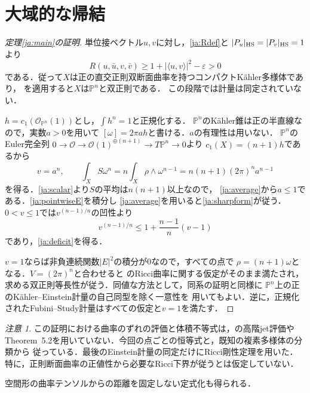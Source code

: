 \documentclass[12pt]{amsart}
\theoremstyle{definition}
\theoremstyle{remark}
\numberwithin{equation}{section}
\newcommand{\cO}{\mathcal{O}}
\theoremstyle{plain}
\theoremstyle{remark}
\newtheorem{jrem}[thm]{注意}
\theoremstyle{definition}
\begin{document}
\section{大域的な帰結}\label{ja:global}

\begin{proof}[定理\ref{ja:main}の証明]
単位接ベクトル$u,v$に対し，\eqref{ja:Rdef}と
$|P_u|_{\rm HS}=|P_v|_{\rm HS}=1$より
\[
 R(u,\bar u,v,\bar v)
 \geq1+|\langle u,v\rangle|^2-\varepsilon>0
\]
である．従って$X$は正の直交正則双断面曲率を持つコンパクトK\"ahler多様体であり，
\cite[Theorem 0.1]{ja:FLW}を適用すると$X$は$\mathbb P^n$と双正則である．
この段階では計量は同定されていない．

$h=c_1(\cO_{\mathbb P^n}(1))$とし，$\int h^n=1$と正規化する．
$\mathbb P^n$のK\"ahler錐は正の半直線なので，実数$a>0$を用いて
$[\omega]=2\pi a h$と書ける．$a$の有理性は用いない．
$\mathbb P^n$のEuler完全列
$0\to\cO\to\cO(1)^{\oplus(n+1)}\to T\mathbb P^n\to0$より
$c_1(X)=(n+1)h$であるから
\begin{equation}\label{ja:average}
 v=a^n,\qquad
 \int_X S\omega^n
 =n\int_X\rho\wedge\omega^{n-1}
 =n(n+1)(2\pi)^n a^{n-1}
\end{equation}
を得る．\eqref{ja:scalar}より$S$の平均は$n(n+1)$以上なので，
\eqref{ja:average}から$a\leq1$である．\eqref{ja:pointwiseE}を積分し
\eqref{ja:average}を用いると\eqref{ja:sharpform}が従う．
$0<v\leq1$では$v^{(n-1)/n}$の凹性より
\[
 v^{(n-1)/n}\leq1+\frac{n-1}{n}(v-1)
\]
であり，\eqref{ja:deficit}を得る．

$v=1$ならば非負連続関数$|E|^2$の積分が0なので，すべての点で
$\rho=(n+1)\omega$となる．$V=(2\pi)^n$と合わせると
\cite[Corollary 5.3(2)]{ja:DS}のRicci曲率に関する仮定がそのまま満たされ，
求める双正則等長性が従う．同値な方法として，同系の証明と同様に
$\mathbb P^n$上の正のK\"ahler--Einstein計量の自己同型を除く一意性を
用いてもよい．逆に，正規化されたFubini--Study計量はすべての仮定と$v=1$を満たす．
\end{proof}

\begin{jrem}\label{ja:dependencies}
この証明における曲率のずれの評価と体積不等式は，\cite{ja:DS}の高階jet評価や
Theorem~5.2を用いていない．今回の点ごとの恒等式と，既知の複素多様体の分類から
従っている．最後のEinstein計量の同定だけにRicci剛性定理を用いた．
特に，正則断面曲率の正値性から必要なRicci下界が従うとは仮定していない．
\end{jrem}

空間形の曲率テンソルからの距離を固定しない定式化も得られる．
\end{document}
